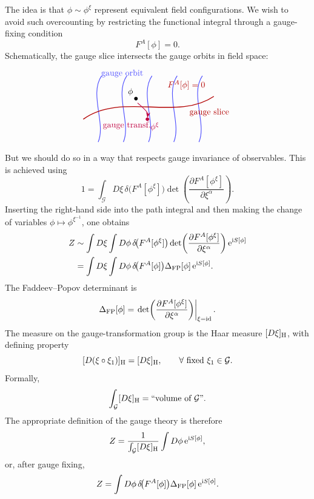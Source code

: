 The idea is that \(\phi\sim\phi^\xi\) represent equivalent field
configurations.  We wish to avoid such overcounting by restricting the
functional integral through a gauge-fixing condition
\[
  F^A[\phi]=0.
\]
Schematically, the gauge slice intersects the gauge orbits in field
space:
\[
\begin{tikzpicture}[>=Stealth,scale=0.95]
  \foreach \x/\lab in {-2.2/{},-1.1/{gauge orbit},0.0/{},1.1/{},2.2/{}} {
    \draw[blue!70,line width=0.8pt]
      (\x,-1.45) .. controls (\x+0.35,-0.65) and (\x-0.4,0.65) .. (\x+0.15,1.45);
  }
  \draw[red!70!black,line width=1.0pt]
    (-2.85,-0.45) .. controls (-1.2,0.75) and (1.25,-0.55) .. (2.85,0.55);
  \node[red!70!black] at (1.65,1.05) {\(F^A[\phi]=0\)};
  \node[red!70!black] at (2.65,-0.15) {gauge slice};

  \fill[black] (-0.55,0.45) circle (2.2pt);
  \node[above left] at (-0.55,0.45) {\(\phi\)};
  \fill[purple] (-0.05,-0.45) circle (2.2pt);
  \node[below right,purple] at (-0.05,-0.45) {\(\phi^\xi\)};
  \draw[->,purple,line width=0.8pt]
    (-0.48,0.26) .. controls (-0.15,-0.02) and (-0.02,-0.18) .. (-0.05,-0.39);
  \node[purple] at (-0.95,-0.72) {gauge transf.};
  \node[blue!70] at (-1.15,1.55) {gauge orbit};
\end{tikzpicture}
\]
But we should do so in a way that respects gauge invariance of
observables.  This is achieved using
\[
  1
  =
  \int_{\mathcal G}D\xi\,
  \delta\!\bigl(F^A[\phi^\xi]\bigr)
  \det\!\left(
    \frac{\partial F^A[\phi^\xi]}{\partial \xi^\alpha}
  \right).
\]
Inserting the right-hand side into the path integral and then making the
change of variables \(\phi\mapsto\phi^{\xi^{-1}}\), one obtains
\[
\begin{aligned}
  Z
  &\sim
  \int D\xi\int D\phi\,
  \delta\!\bigl(F^A[\phi^\xi]\bigr)
  \det\!\left(
    \frac{\partial F^A[\phi^\xi]}{\partial \xi^\alpha}
  \right)
  \mathrm{e}^{\mathrm{i} S[\phi]}
\\
  &=
  \int D\xi\int D\phi\,
  \delta\!\bigl(F^A[\phi]\bigr)
  \Delta_{\rm FP}[\phi]\,
  \mathrm{e}^{\mathrm{i} S[\phi]} .
\end{aligned}
\]
The Faddeev--Popov determinant is
\[
  \Delta_{\rm FP}[\phi]
  =
  \left.
  \det\!\left(
    \frac{\partial F^A[\phi^\xi]}{\partial\xi^\alpha}
  \right)\right|_{\xi=\mathrm{id}} .
\]
The measure on the gauge-transformation group is the Haar measure
\([D\xi]_{\rm H}\), with defining property
\[
  [D(\xi\circ\xi_1)]_{\rm H}=[D\xi]_{\rm H},
  \qquad
  \forall\hbox{ fixed }\xi_1\in\mathcal G.
\]
Formally,
\[
  \int_{\mathcal G}[D\xi]_{\rm H}
  =
  \hbox{``volume of }\mathcal G\hbox{''}.
\]
The appropriate definition of the gauge theory is therefore
\[
  Z
  =
  \frac{1}{\int_{\mathcal G}[D\xi]_{\rm H}}
  \int D\phi\,\mathrm{e}^{\mathrm{i} S[\phi]},
\]
or, after gauge fixing,
\[
  Z
  =
  \int D\phi\,
  \delta\!\bigl(F^A[\phi]\bigr)
  \Delta_{\rm FP}[\phi]\,
  \mathrm{e}^{\mathrm{i} S[\phi]}.
\]

